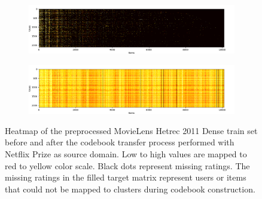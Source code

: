 \vspace*{\fill}
\begin{figure}[hbt!]
\centering
\begin{subfigure}{\textwidth}
\includegraphics[width=\textwidth]{pictures/movielens-full-target}
\end{subfigure}
\begin{subfigure}{\textwidth}
\includegraphics[width=\textwidth]{pictures/movielens-full-target-filled}
\end{subfigure}
\caption{Heatmap of the preprocessed MovieLens Hetrec 2011 Dense train set before and after the codebook transfer process performed with Netflix Prize as source domain. Low to high values are mapped to red to yellow color scale. Black dots represent missing ratings. The missing ratings in the filled target matrix represent users or items that could not be mapped to clusters during codebook construction.}
\end{figure}
\vspace*{\fill}

